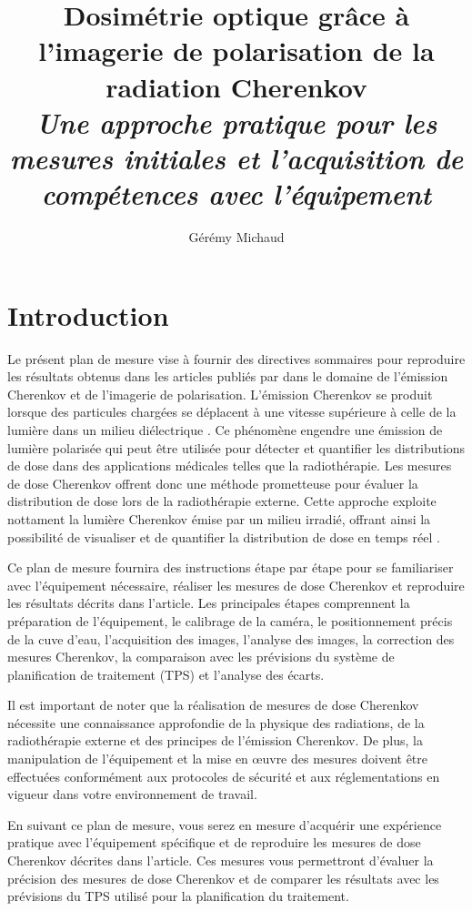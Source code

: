 \documentclass{Thesis}
\title{Dosimétrie optique grâce à l'imagerie de polarisation de la radiation Cherenkov
\\\Large{\textit{Une approche pratique pour les mesures initiales et l'acquisition de compétences avec l'équipement}}}
\author{Gérémy Michaud}{G. Michaud}
\begin{document}
\section*{Introduction}
Le présent plan de mesure vise à fournir des directives sommaires pour reproduire les
résultats obtenus dans les articles publiés par  \cite{cloutierAccurateDoseMeasurements2022, cloutierDirectInwaterRadiation2022}
dans le domaine de l'émission Cherenkov et de l'imagerie de polarisation.
L'émission Cherenkov se produit lorsque des particules chargées se déplacent à une vitesse supérieure à celle de la lumière
dans un milieu diélectrique \cite{cerenkovVisibleRadiationProduced1937}. Ce phénomène engendre une émission de lumière polarisée qui peut
être utilisée pour détecter et quantifier les distributions de dose dans des applications
médicales telles que la radiothérapie. Les mesures de dose Cherenkov offrent donc une
méthode prometteuse pour évaluer la distribution de dose lors de la radiothérapie externe.
Cette approche exploite nottament la lumière Cherenkov émise par un milieu irradié,
offrant ainsi la possibilité de visualiser et de quantifier la distribution de dose en temps réel \cite{jarvisCherenkovVideoImaging2014}.

Ce plan de mesure fournira des instructions étape par étape pour se familiariser avec l'équipement nécessaire, réaliser les mesures de dose Cherenkov et reproduire les résultats décrits dans l'article. Les principales étapes comprennent la préparation de l'équipement, le calibrage de la caméra, le positionnement précis de la cuve d'eau, l'acquisition des images, l'analyse des images, la correction des mesures Cherenkov, la comparaison avec les prévisions du système de planification de traitement (TPS) et l'analyse des écarts.

Il est important de noter que la réalisation de mesures de dose Cherenkov nécessite une connaissance approfondie de la physique des radiations, de la radiothérapie externe et des principes de l'émission Cherenkov. De plus, la manipulation de l'équipement et la mise en œuvre des mesures doivent être effectuées conformément aux protocoles de sécurité et aux réglementations en vigueur dans votre environnement de travail.

En suivant ce plan de mesure, vous serez en mesure d'acquérir une expérience pratique avec l'équipement spécifique et de reproduire les mesures de dose Cherenkov décrites dans l'article. Ces mesures vous permettront d'évaluer la précision des mesures de dose Cherenkov et de comparer les résultats avec les prévisions du TPS utilisé pour la planification du traitement.
\end{document}
